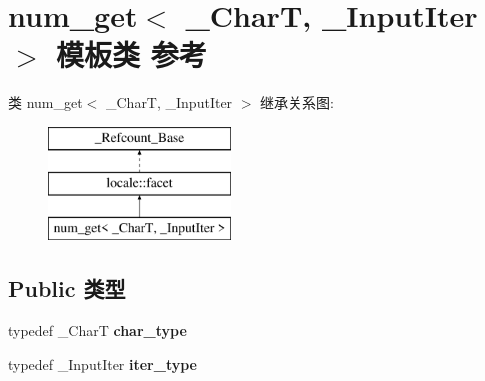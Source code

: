 \hypertarget{classnum__get}{}\section{num\+\_\+get$<$ \+\_\+\+CharT, \+\_\+\+Input\+Iter $>$ 模板类 参考}
\label{classnum__get}
类 num\+\_\+get$<$ \+\_\+\+CharT, \+\_\+\+Input\+Iter $>$ 继承关系图\+:\begin{figure}[H]
\begin{center}
\leavevmode
\includegraphics[height=3.000000cm]{classnum__get}
\end{center}
\end{figure}
\subsection*{Public 类型}
\begin{DoxyCompactItemize}
\item 
\mbox{\label{classnum__get_aba21fc1510f46cf88fdc39a184cd22fa}} 
typedef \+\_\+\+CharT {\bfseries char\+\_\+type}
\item 
\mbox{\label{classnum__get_a8f6fdfced6a69a6aa7627ee4b49be053}} 
typedef \+\_\+\+Input\+Iter {\bfseries iter\+\_\+type}
\end{DoxyCompactItemize}
